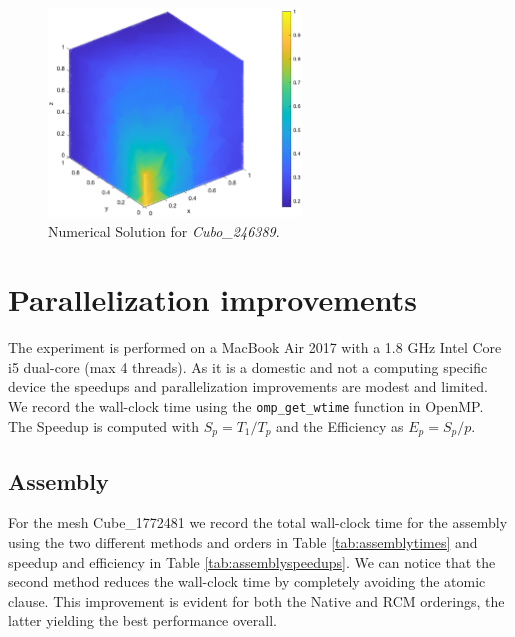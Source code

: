 \documentclass[hidelinks]{article}
\begin{document}
\begin{figure}[H]
    \centering
    \includegraphics[width= 0.6\textwidth]{pic/sol246389.eps}
    \caption{Numerical Solution for \emph{Cubo\_246389}.}\label{fig:numericalsol} 
\end{figure}

\section{Parallelization improvements}
The experiment is performed on a MacBook Air 2017 with a 1.8 GHz Intel Core i5 dual-core (max 4 threads). As it is a domestic and not a computing specific device the speedups and parallelization improvements are modest and limited.
We record the wall-clock time using the \texttt{omp\_get\_wtime} function in OpenMP. The Speedup is computed with $S_p = T_1/T_p$ and the Efficiency as $E_p = S_p/p$.
\subsection{Assembly}
For the mesh Cube\_1772481 we record the total wall-clock time for the assembly using the two different methods and orders in Table \ref{tab:assemblytimes} and speedup and efficiency in Table \ref{tab:assemblyspeedups}.
We can notice that the second method reduces the wall-clock time by completely avoiding the atomic clause. This improvement is evident for both the Native and RCM orderings, the latter yielding the best performance overall.
\end{document}
